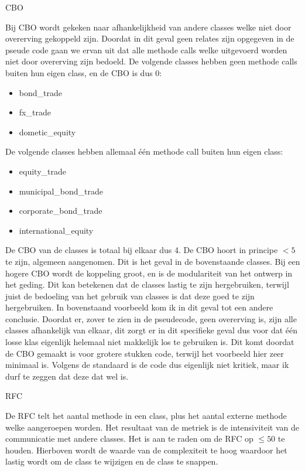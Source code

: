 \documentclass[a4paper,titlepage]{artikel1}
\begin{document}
   \begin{center}\begin{bf}CBO\end{bf}\end{center}
   Bij CBO wordt gekeken naar afhankelijkheid van andere classes welke niet door overerving gekoppeld zijn. Doordat in dit geval geen relates zijn opgegeven in de pseude code gaan we ervan uit dat alle methode calls welke uitgevoerd worden niet door overerving zijn bedoeld. De volgende classes hebben geen methode calls buiten hun eigen class, en de CBO is dus 0:
   \begin{itemize}
     \item bond\_trade
     \item fx\_trade
     \item dometic\_equity
   \end{itemize}
   De volgende classes hebben allemaal \'{e}\'{e}n methode call buiten hun eigen class:
   \begin{itemize}
     \item equity\_trade
     \item municipal\_bond\_trade
     \item corporate\_bond\_trade
     \item international\_equity
   \end{itemize}
   De CBO van de classes is totaal bij elkaar dus 4. De CBO hoort in principe $<5$ te zijn, algemeen aangenomen. Dit is het geval in de bovenstaande classes. Bij een hogere CBO wordt de koppeling groot, en is de modulariteit van het ontwerp in het geding. Dit kan betekenen dat de classes lastig te zijn hergebruiken, terwijl juist de bedoeling van het gebruik van classes is dat deze goed te zijn hergebruiken. In bovenstaand voorbeeld kom ik in dit geval tot een andere conclusie. Doordat er, zover te zien in de pseudecode, geen overerving is, zijn alle classes afhankelijk van elkaar, dit zorgt er in dit specifieke geval dus voor dat \'{e}\'{e}n losse klas eigenlijk helemaal niet makkelijk los te gebruiken is. Dit komt doordat de CBO gemaakt is voor grotere stukken code, terwijl het voorbeeld hier zeer minimaal is. Volgens de standaard is de code dus eigenlijk niet kritiek, maar ik durf te zeggen dat deze dat wel is.
   \begin{center}\begin{bf}RFC\end{bf}\end{center}
   De RFC telt het aantal methode in een class, plus het aantal externe methode welke aangeroepen worden. Het resultaat van de metriek is de intensiviteit van de communicatie met andere classes. Het is aan te raden om de RFC op $\leq50$ te houden. Hierboven wordt de waarde van de complexiteit te hoog waardoor het lastig wordt om de class te wijzigen en de class te snappen.
\end{document}
